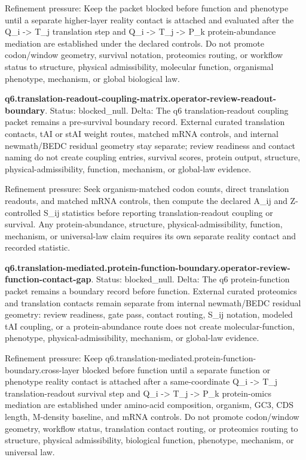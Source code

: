 Refinement pressure: Keep the packet blocked before function and phenotype until a separate higher-layer reality contact is attached and evaluated after the Q\_i -> T\_j translation step and Q\_i -> T\_j -> P\_k protein-abundance mediation are established under the declared controls. Do not promote codon/window geometry, survival notation, proteomics routing, or workflow status to structure, physical admissibility, molecular function, organismal phenotype, mechanism, or global biological law.

\textbf{q6.translation-readout-coupling-matrix.operator-review-readout-boundary}. Status: blocked\_null. Delta: The q6 translation-readout coupling packet remains a pre-survival boundary record. External curated translation contacts, tAI or stAI weight routes, matched mRNA controls, and internal newmath/BEDC residual geometry stay separate; review readiness and contact naming do not create coupling entries, survival scores, protein output, structure, physical-admissibility, function, mechanism, or global-law evidence.

Refinement pressure: Seek organism-matched codon counts, direct translation readouts, and matched mRNA controls, then compute the declared A\_ij and Z-controlled S\_ij statistics before reporting translation-readout coupling or survival. Any protein-abundance, structure, physical-admissibility, function, mechanism, or universal-law claim requires its own separate reality contact and recorded statistic.

\textbf{q6.translation-mediated.protein-function-boundary.operator-review-function-contact-gap}. Status: blocked\_null. Delta: The q6 protein-function packet remains a boundary record before function. External curated proteomics and translation contacts remain separate from internal newmath/BEDC residual geometry: review readiness, gate pass, contact routing, S\_ij notation, modeled tAI coupling, or a protein-abundance route does not create molecular-function, phenotype, physical-admissibility, mechanism, or global-law evidence.

Refinement pressure: Keep q6.translation-mediated.protein-function-boundary.cross-layer blocked before function until a separate function or phenotype reality contact is attached after a same-coordinate Q\_i -> T\_j translation-readout survival step and Q\_i -> T\_j -> P\_k protein-omics mediation are established under amino-acid composition, organism, GC3, CDS length, M-density baseline, and mRNA controls. Do not promote codon/window geometry, workflow status, translation contact routing, or proteomics routing to structure, physical admissibility, biological function, phenotype, mechanism, or universal law.

